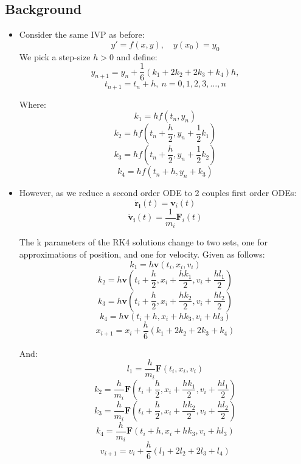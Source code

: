 \documentclass[11pt]{article}
\newcommand{\psubsubsection}[1]{{\subsection*{#1}}}
\begin{document}
    \psubsubsection{Background}
    \begin{itemize}
        \item Consider the same IVP as before:
        \[ \label{eq:3.1.1} y'=f(x,y),\quad y(x_0)=y_0 \]
        We pick a step-size $h>0$ and define:
        \[ y_{n+1} = y_n + \frac{1}{6}(k_1 + 2k_2 + 2k_3 + k_4)h, \]
        \[ t_{n+1} = t_n + h, \ n= 0,1,2,3,\dots,n \]

        Where:
        \[ k_{1}=h f\left(t_{n}, y_{n}\right) \]
        \[ k_{2}=h f\left(t_{n}+\frac{h}{2}, y_{n}+\frac{1}{2} k_{1}\right) \]
        \[ k_{3}=h f\left(t_{n}+\frac{h}{2}, y_{n}+\frac{1}{2} k_{2}\right) \]
        \[ k_{4}=h f\left(t_{n}+h, y_{n}+k_{3}\right) \]

        \item However, as we reduce a second order ODE to 2 couples first order ODEs:
        \[  \mathbf{\dot{r}_i}(t) = \mathbf{v}_i(t) \]
        \[ \mathbf{\dot{v}_i}(t) = \frac{1}{m_i}\mathbf{F}_i(t) \]

        The k parameters of the RK4 solutions change to two sets, one for approximations of position, and one for velocity. Given as follows:
        \[ k_{1}=h \mathbf{v}\left(t_{i}, x_{i}, v_{i}\right) \]
        \[ k_{2}=h \mathbf{v}\left(t_{i} + \frac{h}{2}, x_{i} +\frac{hk_1}{2}, v_{i}+\frac{hl_1}{2}\right) \]
        \[ k_{3}=h \mathbf{v}\left(t_{i} + \frac{h}{2}, x_{i} +\frac{hk_2}{2}, v_{i}+\frac{hl_2}{2}\right) \]
        \[ k_{4}=h \mathbf{v}\left(t_{i}+h, x_{i}+hk_3, v_{i}+hl_3\right) \]
        \[ x_{i+1} = x_i + \frac{h}{6} \left( k_1 + 2k_2 + 2k_3 + k_4 \right) \]

        And:
        \[ l_{1}=\frac{h}{m_i} \mathbf{F}\left(t_{i}, x_{i}, v_{i}\right) \]
        \[ k_{2}=\frac{h}{m_i} \mathbf{F}\left(t_{i} + \frac{h}{2}, x_{i} +\frac{hk_1}{2}, v_{i}+\frac{hl_1}{2}\right) \]
        \[ k_{3}=\frac{h}{m_i} \mathbf{F}\left(t_{i} + \frac{h}{2}, x_{i} +\frac{hk_2}{2}, v_{i}+\frac{hl_2}{2}\right) \]
        \[ k_{4}=\frac{h}{m_i} \mathbf{F}\left(t_{i}+h, x_{i}+hk_3, v_{i}+hl_3\right) \]
        \[ v_{i+1} = v_i + \frac{h}{6} \left( l_1 + 2l_2 + 2l_3 + l_4 \right) \]
    \end{itemize}
    
\end{document}
